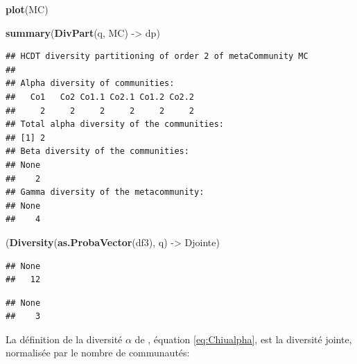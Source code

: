 \documentclass[
  11pt,
  french,
  a4paper,
  extrafontsizes,onecolumn,openright
  ]{memoir}
\newenvironment{Shaded}{\begin{snugshade}}{\end{snugshade}}
\newcommand{\FunctionTok}[1]{\textcolor[rgb]{0.13,0.29,0.53}{\textbf{#1}}}
\newcommand{\NormalTok}[1]{#1}
\newcommand{\OtherTok}[1]{\textcolor[rgb]{0.56,0.35,0.01}{#1}}
\newcommand{\SpecialCharTok}[1]{\textcolor[rgb]{0.81,0.36,0.00}{\textbf{#1}}}
\begin{document}
\begin{Shaded}
\begin{Highlighting}[]
\FunctionTok{plot}\NormalTok{(MC)}
\end{Highlighting}
\end{Shaded}

\normalsize

\scriptsize

\begin{Shaded}
\begin{Highlighting}[]
\FunctionTok{summary}\NormalTok{(}\FunctionTok{DivPart}\NormalTok{(q, MC) }\OtherTok{{-}\textgreater{}}\NormalTok{ dp)}
\end{Highlighting}
\end{Shaded}

\begin{verbatim}
## HCDT diversity partitioning of order 2 of metaCommunity MC
## 
## Alpha diversity of communities: 
##   Co1   Co2 Co1.1 Co2.1 Co1.2 Co2.2 
##     2     2     2     2     2     2 
## Total alpha diversity of the communities: 
## [1] 2
## Beta diversity of the communities: 
## None 
##    2 
## Gamma diversity of the metacommunity: 
## None 
##    4
\end{verbatim}

\begin{Shaded}
\begin{Highlighting}[]
\NormalTok{(}\FunctionTok{Diversity}\NormalTok{(}\FunctionTok{as.ProbaVector}\NormalTok{(df3), q) }\OtherTok{{-}\textgreater{}}\NormalTok{ Djointe)}
\end{Highlighting}
\end{Shaded}

\begin{verbatim}
## None 
##   12
\end{verbatim}

\begin{Shaded}
\end{Shaded}

\begin{verbatim}
## None 
##    3
\end{verbatim}

\normalsize

La définition de la diversité \(\alpha\) de \textcite{Chiu2014}, équation \eqref{eq:Chiualpha}, est la diversité jointe, normalisée par le nombre de communautés:
\end{document}
